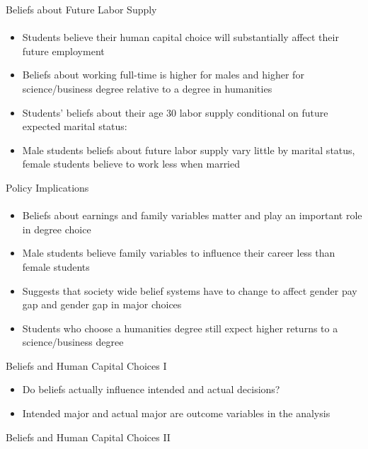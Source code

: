 \documentclass[12pt]{beamer}
\begin{document}
\begin{frame}{Beliefs about Future Labor Supply}
    \framesubtitle{} 
    \begin{itemize}
        \item Students believe their human capital choice will substantially affect their future employment
        \item Beliefs about working full-time is higher for males and higher for science/business degree relative to a degree in humanities
        \item Students' beliefs about their age 30 labor supply conditional on future expected marital status:
        \item Male students beliefs about future labor supply vary little by marital status, female students believe to work less when married
    \end{itemize}
\end{frame}

\begin{frame}{Policy Implications}
    \framesubtitle{} 
    \begin{itemize}
        \item Beliefs about earnings and family variables matter and play an important role in degree choice 
        \item Male students believe family variables to influence their career less than female students  
        \item Suggests that society wide belief systems have to change to affect gender pay gap and gender gap in major choices 
        \item Students who choose a humanities degree still expect higher returns to a science/business degree
    \end{itemize}
\end{frame}

\begin{frame}{Beliefs and Human Capital Choices I}
    \begin{itemize}
        \item Do beliefs actually influence intended and actual decisions?
        \item Intended major and actual major are outcome variables in the analysis
    \end{itemize}  
\end{frame}

\begin{frame}{Beliefs and Human Capital Choices II}
     \begin{center}
    \end{center}
\end{frame}
\end{document}
